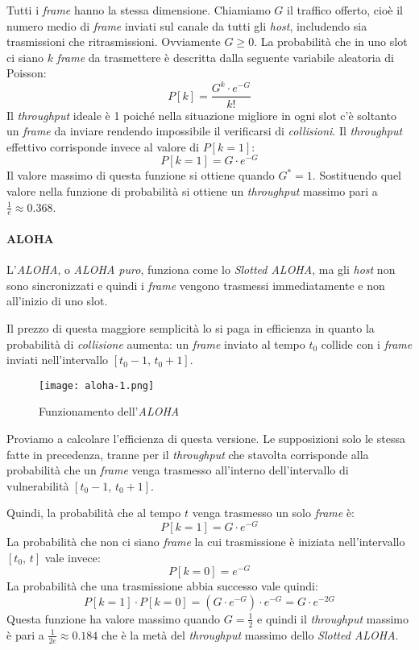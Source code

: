 Tutti i \emph{frame} hanno la stessa dimensione. Chiamiamo $G$ il traffico
offerto, cioè il numero medio di \emph{frame} inviati sul canale da tutti gli
\emph{host}, includendo sia trasmissioni che ritrasmissioni. Ovviamente $G\geq0$.
La probabilità che in uno slot ci siano $k$ \emph{frame} da trasmettere è
descritta dalla seguente variabile aleatoria di Poisson:
\[P[k]=\frac{G^k\cdot e^{-G}}{k!}\]
Il \emph{throughput} ideale è 1 poiché nella situazione migliore in ogni slot
c'è soltanto un \emph{frame} da inviare rendendo impossibile il verificarsi di
\emph{collisioni}. Il \emph{throughput} effettivo corrisponde invece al valore
di $P[k=1]$:
\[P[k=1]=G\cdot e^{-G}\]
Il valore massimo di questa funzione si ottiene quando $G^*=1$. Sostituendo quel
valore nella funzione di probabilità si ottiene un \emph{throughput} massimo
pari a $\frac{1}{e}\approx0.368$.

\paragraph{ALOHA}
L'\emph{ALOHA}, o \emph{ALOHA puro}, funziona come lo \emph{Slotted ALOHA}, ma
gli \emph{host} non sono sincronizzati e quindi i \emph{frame} vengono trasmessi
immediatamente e non all'inizio di uno slot.

Il prezzo di questa maggiore semplicità lo si paga in efficienza in quanto la
probabilità di \emph{collisione} aumenta: un \emph{frame} inviato al tempo $t_0$
collide con i \emph{frame} inviati nell'intervallo $[t_0-1,\,t_0+1]$.

\begin{figure}[h!]
    \centering
    \texttt{[image: aloha-1.png]}
    \caption{Funzionamento dell'\emph{ALOHA}}
\end{figure}

\bigskip\noindent
Proviamo a calcolare l'efficienza di questa versione. Le supposizioni solo le
stessa fatte in precedenza, tranne per il \emph{throughput} che stavolta corrisponde
alla probabilità che un \emph{frame} venga trasmesso all'interno dell'intervallo
di vulnerabilità $[t_0-1,\,t_0+1]$.

Quindi, la probabilità che al tempo $t$ venga trasmesso un solo \emph{frame} è:
\[P[k=1]=G\cdot e^{-G}\]
La probabilità che non ci siano \emph{frame} la cui trasmissione è iniziata
nell'intervallo $[t_0,\,t]$ vale invece:
\[P[k=0]=e^{-G}\]
La probabilità che una trasmissione abbia successo vale quindi:
\[P[k=1]\cdot P[k=0]=(G\cdot e^{-G})\cdot e^{-G}=G\cdot e^{-2G}\]
Questa funzione ha valore massimo quando $G=\frac{1}{2}$ e quindi il
\emph{throughput} massimo è pari a $\frac{1}{2e}\approx0.184$ che è la metà
del \emph{throughput} massimo dello \emph{Slotted ALOHA}.

